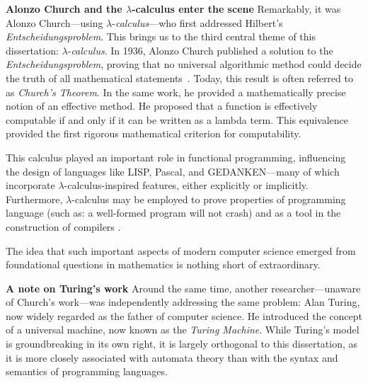  
\noindent \textbf{Alonzo Church and the $\lambda$-calculus enter the scene}
Remarkably, it was Alonzo Church—using $\lambda$-\textit{calculus}—who first addressed Hilbert’s \emph{Entscheidungsproblem}. This brings us to the third central theme of this dissertation: $\lambda$-\textit{calculus}. In 1936, Alonzo Church published a solution to the \emph{Entscheidungsproblem}, proving that no universal algorithmic method  could decide the truth of all mathematical statements~\cite{church1936}. Today, this result is often referred to as \emph{Church’s Theorem}. In the same work, he provided a mathematically precise notion of an effective method. He proposed that a function is effectively computable if and only if it can be written as a lambda term. This equivalence provided the first rigorous mathematical criterion for computability.

This calculus played an important role in functional programming, influencing the design of languages like LISP, Pascal, and GEDANKEN—many of which incorporate $\lambda$-calculus-inspired features, either explicitly or implicitly. Furthermore, $\lambda$-calculus may be employed to prove properties of programming language (such as: a well-formed program will not crash) and as a tool in the construction of compilers \cite{jonesImplementationFunctionalProgramming}.

The idea that such important aspects of modern computer science emerged from foundational questions in mathematics is nothing short of extraordinary.

\noindent \textbf{A note on Turing's work}
Around the same time, another researcher—unaware of Church’s work—was independently addressing the same problem: Alan Turing, now widely regarded as the father of computer science. He introduced the concept of a universal machine, now known as the \emph{Turing Machine}. While Turing’s model is groundbreaking in its own right, it is largely orthogonal to this dissertation, as it is more closely associated with automata theory than with the syntax and semantics of programming languages.




